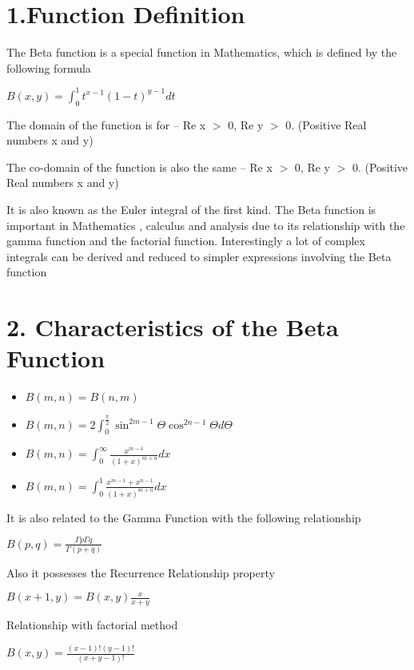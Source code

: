 \documentclass[12pt,letterpaper]{article}
\begin{document}
\section*{1.Function Definition}

The Beta function is a special function in Mathematics, which is defined by the following formula

$B(x,y)=\int_{0}^{1} t^{x-1} {(1-t)}^{y-1} dt$

The domain of the function is for -- Re x $>$ 0, Re y $>$ 0. (Positive Real numbers x and y)

The co-domain of the function is also the same – Re x $>$ 0, Re y $>$ 0. (Positive Real numbers x and y)

It is also known as the Euler integral of the first kind. The Beta function is important in Mathematics , calculus and analysis due to its relationship with the gamma function and the factorial function. Interestingly a lot of complex integrals can be derived and reduced to simpler expressions involving the Beta function


\section*{2. Characteristics of the Beta Function}

\begin{itemize}
    \item
   $B(m,n)=B(n,m)$
  \item
$B(m,n)=2\int_0^{\frac{\pi}{2}}\sin^{2m-1}\Theta\cos^{2n-1}\Theta d\Theta$

  

    \item $B(m,n)=\int_{0}^{\infty} {\frac{x^{m-1}}{{(1+x)}^{m+n}}}  dx$  
    \item $B(m,n)=\int_{0}^{1} {\frac{x^{m-1}+x^{n-1}}{{(1+x)}^{m+n}}}  dx$ 
\end{itemize} 
    
    
    It is also related to the Gamma Function with the following relationship
    
    
    $B(p,q)={\frac{\Gamma p \Gamma q}{ \Gamma (p+q)}} $
    
Also it possesses the Recurrence Relationship property


$B(x+1,y)={B(x,y) \frac{x}{x+y}} $


Relationship with factorial method

$B(x,y)={\frac{(x-1)!(y-1)!}{(x+y-1)!}} $
\end{document}
